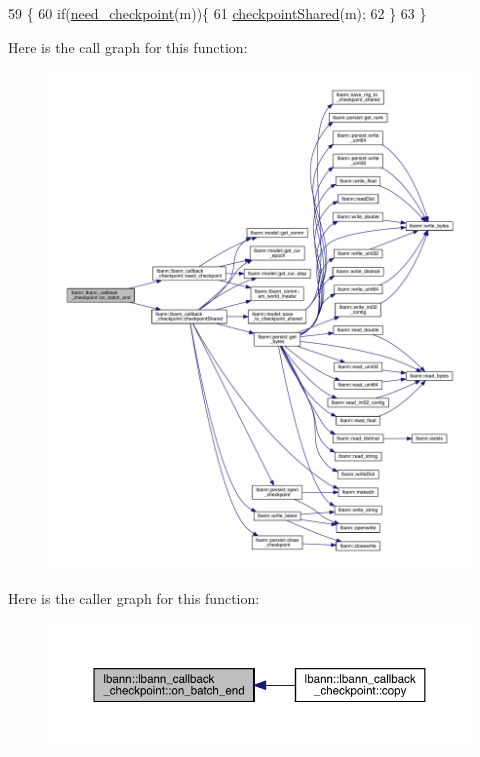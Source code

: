 \begin{DoxyCode}
59                                                      \{
60   \textcolor{keywordflow}{if}(\hyperlink{classlbann_1_1lbann__callback__checkpoint_a2e5f396667ccc45f7203263b06c5e216}{need\_checkpoint}(m))\{
61     \hyperlink{classlbann_1_1lbann__callback__checkpoint_a23b6f5abb924b2c4d0694e98c7d6f4d5}{checkpointShared}(m);
62   \}
63 \}
\end{DoxyCode}
Here is the call graph for this function\+:\nopagebreak
\begin{figure}[H]
\begin{center}
\leavevmode
\includegraphics[width=350pt]{classlbann_1_1lbann__callback__checkpoint_a476527e2b7b44dd3623e01f63ddb5f78_cgraph}
\end{center}
\end{figure}
Here is the caller graph for this function\+:\nopagebreak
\begin{figure}[H]
\begin{center}
\leavevmode
\includegraphics[width=350pt]{classlbann_1_1lbann__callback__checkpoint_a476527e2b7b44dd3623e01f63ddb5f78_icgraph}
\end{center}
\end{figure}
